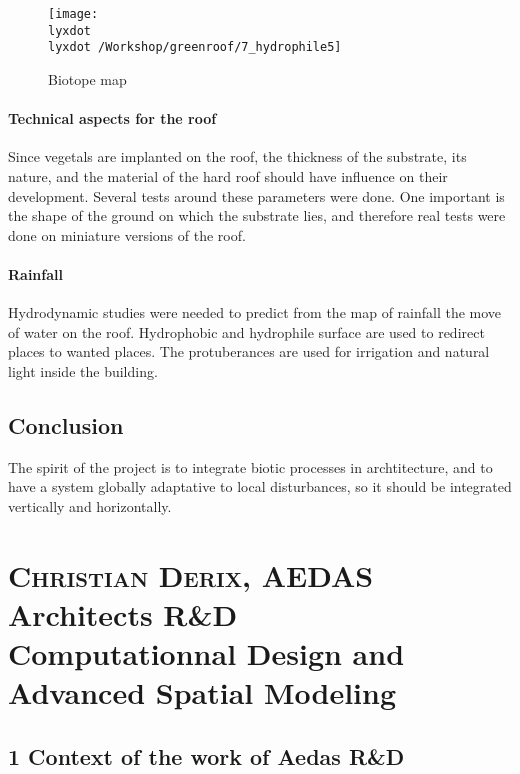 \documentclass[english]{article}
\newcommand{\noun}[1]{\textsc{#1}}
\newcommand{\lyxdot}{.}
\begin{document}
\begin{figure}


\texttt{[image: \\lyxdot \\lyxdot /Workshop/greenroof/7\_hydrophile5]}\caption{Biotope map}


\end{figure}



\paragraph{Technical aspects for the roof}

Since vegetals are implanted on the roof, the thickness of the substrate,
its nature, and the material of the hard roof should have influence
on their development. Several tests around these parameters were done.
One important is the shape of the ground on which the substrate lies,
and therefore real tests were done on miniature versions of the roof.


\paragraph{Rainfall}

Hydrodynamic studies were needed to predict from the map of rainfall
the move of water on the roof. Hydrophobic and hydrophile surface
are used to redirect places to wanted places. The protuberances are
used for irrigation and natural light inside the building.


\subsection*{Conclusion}

The spirit of the project is to integrate biotic processes in archtitecture,
and to have a system globally adaptative to local disturbances, so
it should be integrated vertically and horizontally.

\newpage{}


\section*{\noun{Christian Derix}, AEDAS Architects R\&D\protect \\
Computationnal Design and Advanced Spatial Modeling}


\subsection*{1 Context of the work of Aedas R\&D}
\end{document}
